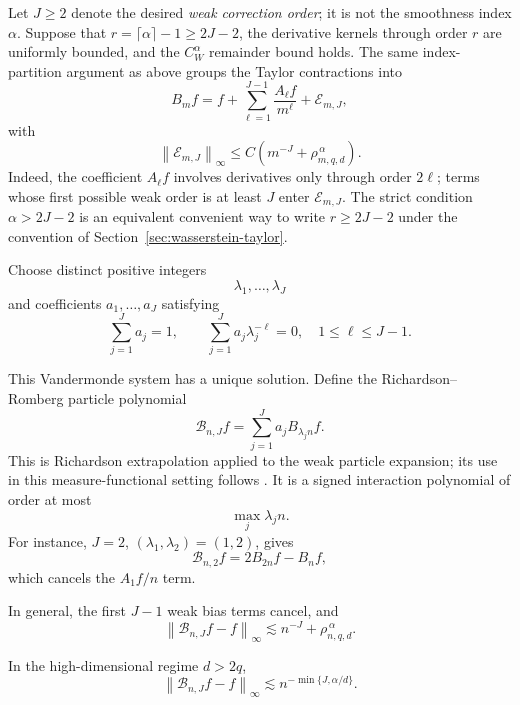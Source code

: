 \documentclass[11pt]{article}
\newcommand{\norm}[1]{\left\lVert #1\right\rVert}
\begin{document}
Let \(J\geq2\) denote the desired \emph{weak correction order}; it is
not the smoothness index \(\alpha\). Suppose that
\(r=\lceil\alpha\rceil-1\geq2J-2\), the derivative kernels through
order \(r\) are uniformly bounded, and the \(C_W^\alpha\) remainder
bound holds. The same index-partition argument as above groups the
Taylor contractions into
\[
B_mf
=
f
+
\sum_{\ell=1}^{J-1}\frac{A_\ell f}{m^\ell}
+
\mathcal E_{m,J},
\]
with
\[
\norm{\mathcal E_{m,J}}_\infty
\leq
C\left(m^{-J}+\rho_{m,q,d}^{\,\alpha}\right).
\]
Indeed, the coefficient \(A_\ell f\) involves derivatives only through
order \(2\ell\); terms whose first possible weak order is at least
\(J\) enter \(\mathcal E_{m,J}\). The strict condition
\(\alpha>2J-2\) is an equivalent convenient way to write
\(r\geq2J-2\) under the convention of
Section~\ref{sec:wasserstein-taylor}.

Choose distinct positive integers
\[
\lambda_1,\ldots,\lambda_J
\]
and coefficients \(a_1,\ldots,a_J\) satisfying
\[
\sum_{j=1}^J a_j=1,
\qquad
\sum_{j=1}^J a_j\lambda_j^{-\ell}=0,
\quad
1\leq\ell\leq J-1.
\]

This Vandermonde system has a unique solution. Define the
Richardson--Romberg particle polynomial
\[
\mathcal B_{n,J}f
=
\sum_{j=1}^J a_j B_{\lambda_j n}f.
\]
This is Richardson extrapolation \cite{richardson} applied to the weak
particle expansion; its use in this measure-functional setting follows
\cite{chassagneux-szpruch-tse}.
It is a signed interaction polynomial of order at most
\[
\max_j\lambda_j n.
\]
For instance, \(J=2\), \((\lambda_1,\lambda_2)=(1,2)\), gives
\[
\mathcal B_{n,2}f=2B_{2n}f-B_nf,
\]
which cancels the \(A_1f/n\) term.

In general, the first \(J-1\) weak bias terms cancel, and
\[
\boxed{
\norm{\mathcal B_{n,J}f-f}_\infty
\lesssim
n^{-J}+\rho_{n,q,d}^{\,\alpha}.
}
\]

In the high-dimensional regime \(d>2q\),
\[
\boxed{
\norm{\mathcal B_{n,J}f-f}_\infty
\lesssim
n^{-\min\{J,\alpha/d\}}.
}
\]
\end{document}
